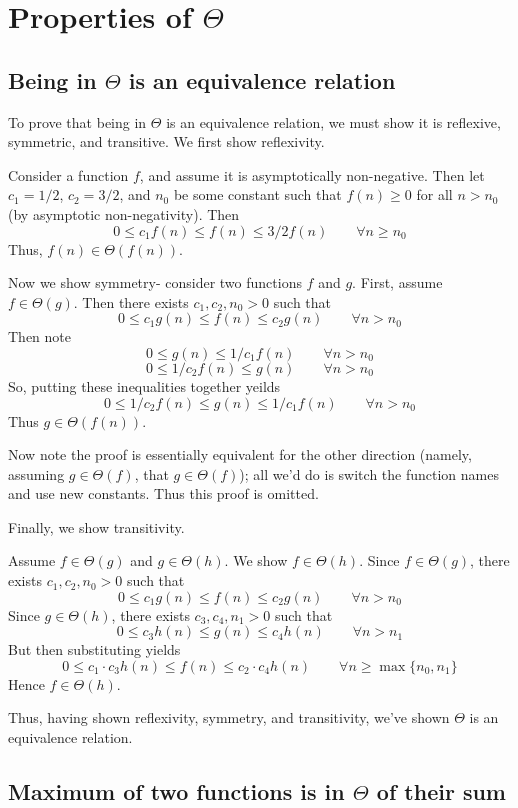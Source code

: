 \documentclass[paper=a4, fontsize=11pt]{scrartcl} %
\numberwithin{equation}{section} %
\numberwithin{figure}{section} %
\numberwithin{table}{section} %
\begin{document}
\section{Properties of $\Theta$}
\subsection{Being in $\Theta$ is an equivalence relation}

To prove that being in $\Theta$ is an equivalence relation, we must show it is reflexive, symmetric, and transitive. We first show reflexivity.

Consider a function $f$, and assume it is asymptotically non-negative. Then let $c_1 = 1/2$, $c_2 = 3/2$, and $n_0$ be some constant such that $f(n) \geq 0$ for all $n > n_0$ (by asymptotic non-negativity). Then
\[0 \leq c_1 f(n) \leq f(n) \leq 3/2 f(n) \qquad{} \forall n \geq n_0\]
Thus, $f(n) \in \Theta(f(n))$.

Now we show symmetry- consider two functions $f$ and $g$. First, assume $f \in \Theta(g)$. Then there exists $c_1, c_2, n_0 > 0$ such that
\[0 \leq c_1 g(n) \leq f(n) \leq c_2g(n) \qquad{} \forall n > n_0\]
Then note
\[0 \leq g(n) \leq 1/c_1 f(n) \qquad{} \forall n > n_0\]
\[0 \leq 1/c_2 f(n) \leq g(n) \qquad{} \forall n > n_0\]
So, putting these inequalities together yeilds
\[0 \leq 1/c_2 f(n) \leq g(n) \leq 1/c_1 f(n) \qquad{} \forall n > n_0\]
Thus $g \in \Theta(f(n))$.

Now note the proof is essentially equivalent for the other direction (namely, assuming $g \in \Theta(f)$, that $g \in \Theta(f)$); all we'd do is switch the function names and use new constants. Thus this proof is omitted.

Finally, we show transitivity.

Assume $f \in \Theta(g)$ and $g \in \Theta(h)$. We show $f \in \Theta(h)$. Since $f \in \Theta(g)$, there exists $c_1, c_2, n_0 > 0$ such that
\[0 \leq c_1 g(n) \leq f(n) \leq c_2 g(n) \qquad{} \forall n > n_0\]
Since $g \in \Theta(h)$, there exists $c_3, c_4, n_1 > 0$ such that
\[0 \leq c_3 h(n) \leq g(n) \leq c_4 h(n) \qquad{} \forall n > n_1\]
But then substituting yields
\[0 \leq c_1\cdot c_3h(n) \leq f(n) \leq c_2 \cdot c_4 h(n) \qquad \forall n\geq \max\{n_0, n_1\}\]
Hence $f \in \Theta(h)$.

Thus, having shown reflexivity, symmetry, and transitivity, we've shown $\Theta$ is an equivalence relation.

\subsection{Maximum of two functions is in $\Theta$ of their sum}
\end{document}
